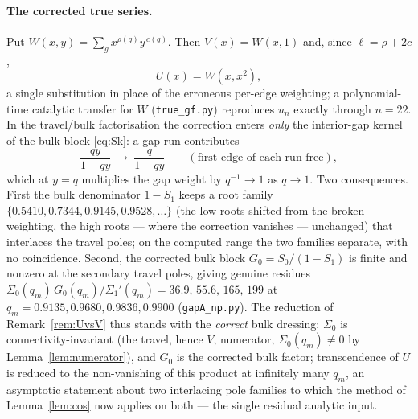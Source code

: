 \paragraph{The corrected true series.} Put $W(x,y)=\sum_g x^{\rho(g)}y^{\,c(g)}$. Then $V(x)=W(x,1)$
and, since $\ell=\rho+2c$,
\begin{equation}\label{eq:UWxx2}
   U(x)=W(x,x^{2}),
\end{equation}
a single substitution in place of the erroneous per-edge weighting; a polynomial-time catalytic
transfer for $W$ (\texttt{true\_gf.py}) reproduces $u_n$ exactly through $n=22$. In the
travel/bulk factorisation the correction enters \emph{only} the interior-gap kernel of the bulk
block \eqref{eq:Sk}: a gap-run contributes
\[
   \frac{qy}{1-qy}\ \longrightarrow\ \frac{q}{1-qy}\qquad(\text{first edge of each run free}),
\]
which at $y=q$ multiplies the gap weight by $q^{-1}\to1$ as $q\to1$. Two consequences. First the
bulk denominator $1-S_1$ keeps a root family $\{0.5410,0.7344,0.9145,0.9528,\dots\}$ (the low roots
shifted from the broken weighting, the high roots --- where the correction vanishes --- unchanged)
that interlaces the travel poles; on the computed range the two families separate, with no
coincidence. Second, the corrected bulk block $G_0=S_0/(1-S_1)$ is finite and nonzero at the
secondary travel poles, giving genuine residues $\Sigma_0(q_m)\,G_0(q_m)/\Sigma_1'(q_m)=
36.9,\,55.6,\,165,\,199$ at $q_m=0.9135,0.9680,0.9836,0.9900$ (\texttt{gapA\_np.py}). The reduction of
Remark~\ref{rem:UvsV} thus stands with the \emph{correct} bulk dressing: $\Sigma_0$ is
connectivity-invariant (the travel, hence $V$, numerator, $\Sigma_0(q_m)\ne0$ by
Lemma~\ref{lem:numerator}), and $G_0$ is the corrected bulk factor; transcendence of $U$ is reduced
to the non-vanishing of this product at infinitely many $q_m$, an asymptotic statement about two
interlacing pole families to which the method of Lemma~\ref{lem:cos} now applies on both --- the
single residual analytic input.


